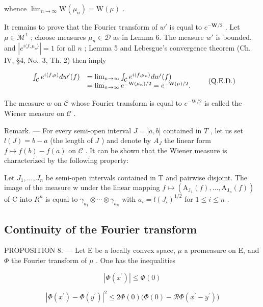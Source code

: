 whence \(\lim_{n\to \infty}\mathrm{W}(\mu_n) = \mathrm{W}(\mu)\) .

It remains to prove that the Fourier transform of \(w'\) is equal to \(e^{-\mathbf{W}/2}\) . Let \(\mu \in \mathcal{M}^1\) ; choose measures \(\mu_n \in \mathcal{D}\) as in Lemma 6. The measure \(w'\) is bounded, and \(|e^{i\langle f,\mu_n\rangle}| = 1\) for all \(n\) ; Lemma 5 and Lebesgue's convergence theorem (Ch. IV, §4, No.~3, Th. 2) then imply

\[
\begin{array}{r l} \int_ {\mathcal {C}} e ^ {i \langle f, \mu \rangle} d w ^ {\prime} (f) & = \lim _ {n \to \infty} \int_ {\mathcal {C}} e ^ {i \langle f, \mu_ {n} \rangle} d w ^ {\prime} (f) \\ & = \lim _ {n \to \infty} e ^ {- \mathrm{W} (\mu_ {n}) / 2} = e ^ {- \mathrm{W} (\mu) / 2}. \end{array}\tag{Q.E.D.}
\]

The measure \(w\) on \(\mathcal{C}\) whose Fourier transform is equal to \(e^{-\mathrm{W} / 2}\) is called the Wiener measure on \(\mathcal{C}\) .

Remark. --- For every semi-open interval \(J = ]a, b]\) contained in \(T\) , let us set \(l(J) = b - a\) (the length of \(J\) ) and denote by \(A_J\) the linear form \(f \mapsto f(b) - f(a)\) on \(\mathcal{C}\) . It can be shown that the Wiener measure is characterized by the following property:

Let \(J_{1},\ldots,J_{n}\) be semi-open intervals contained in T and pairwise disjoint. The image of the measure w under the linear mapping \(f\mapsto\left(\mathrm{A}_{\mathrm{J}_{1}}(f),\ldots,\mathrm{A}_{\mathrm{J}_{n}}(f)\right)\) of C into \(R^{n}\) is equal to \(\gamma_{a_{1}}\otimes\cdots\otimes\gamma_{a_{n}}\) with \(a_{i}=l(J_{i})^{1/2}\) for \(1\leqslant i\leqslant n\) .

\subsection{Continuity of the Fourier transform}

PROPOSITION 8. --- Let E be a locally convex space, \(\mu\) a promeasure on E, and \(\Phi\) the Fourier transform of \(\mu\) . One has the inequalities

\[
\left| \Phi (x ^ {\prime}) \right| \leqslant \Phi (0)\tag{53}
\]

\[
\left| \Phi (x ^ {\prime}) - \Phi (y ^ {\prime}) \right| ^ {2} \leqslant 2 \Phi (0) \big (\Phi (0) - \mathcal {R} \Phi (x ^ {\prime} - y ^ {\prime}) \big)\tag{54}
\]

